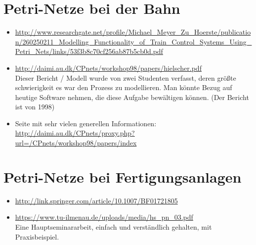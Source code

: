 \documentclass{article}
\begin{document}
\section{Petri-Netze bei der Bahn}
\begin{itemize}
    \item \url{http://www.researchgate.net/profile/Michael_Meyer_Zu_Hoerste/publication/260250211_Modelling_Functionality_of_Train_Control_Systems_Using_Petri_Nets/links/53f3b8c70cf256ab87b5cb0d.pdf}
    \item \url{http://daimi.au.dk/CPnets/workshop98/papers/hielscher.pdf}\\
        Dieser Bericht / Modell wurde von zwei Studenten verfasst, deren größte schwierigkeit es war den Prozess zu modellieren.
        Man könnte Bezug auf heutige Software nehmen, die diese Aufgabe bewältigen können. (Der Bericht ist von 1998)
    \item Seite mit sehr vielen generellen Informationen:\\
        \url{http://daimi.au.dk/CPnets/proxy.php?url=/CPnets/workshop98/papers/index}
\end{itemize}

\section{Petri-Netze bei Fertigungsanlagen}
\begin{itemize}
    \item \url{http://link.springer.com/article/10.1007/BF01721805} \\
    \item \url{https://www.tu-ilmenau.de/uploads/media/hs_pn_03.pdf} \\
        Eine Hauptseminararbeit, einfach und verständlich gehalten, mit Praxisbeispiel.
\end{itemize}
\end{document}
